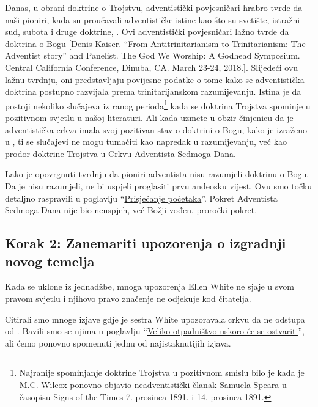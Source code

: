 Danas, u obrani doktrine o Trojstvu, adventistički povjesničari hrabro tvrde da naši pioniri, kada su proučavali adventističke istine kao što su svetište, istražni sud, subota i druge doktrine, . Ovi adventistički povjesničari lažno tvrde da doktrina o Bogu [Denis Kaiser. “From Antitrinitarianism to Trinitarianism: The Adventist story” and Panelist. The God We Worship: A Godhead Symposium. Central California Conference, Dinuba, CA. March 23-24, 2018.]. Slijedeći ovu lažnu tvrdnju, oni predstavljaju povijesne podatke o tome kako se adventistička doktrina postupno razvijala prema trinitarijanskom razumijevanju. Istina je da postoji nekoliko slučajeva iz ranog perioda\footnote{Najranije spominjanje doktrine Trojstva u pozitivnom smislu bilo je kada je M.C. Wilcox ponovno objavio neadventistički članak Samuela Speara u časopisu Signs of the Times 7. prosinca 1891. i 14. prosinca 1891.} kada se doktrina Trojstva spominje u pozitivnom svjetlu u našoj literaturi. Ali kada uzmete u obzir činjenicu da je adventistička crkva imala svoj pozitivan stav o doktrini o Bogu, kako je izraženo u , ti se slučajevi ne mogu tumačiti kao napredak u razumijevanju, već kao prodor doktrine Trojstva u Crkvu Adventista Sedmoga Dana.

Lako je opovrgnuti tvrdnju da pioniri adventista nisu razumjeli doktrinu o Bogu. Da je nisu razumjeli, ne bi uspjeli proglasiti prvu anđeosku vijest. Ovu smo točku detaljno raspravili u poglavlju “\hyperref[chap:remebering-the-beginning]{Prisjećanje početaka}”. Pokret Adventista Sedmoga Dana nije bio neuspjeh, već Božji vođen, proročki pokret.

\subsection*{Korak 2: Zanemariti upozorenja o izgradnji novog temelja}

Kada se  uklone iz jednadžbe, mnoga upozorenja Ellen White ne sjaje u svom pravom svjetlu i njihovo pravo značenje ne odjekuje kod čitatelja.

Citirali smo mnoge izjave gdje je sestra White upozoravala crkvu da ne odstupa od . Bavili smo se njima u poglavlju “\hyperref[chap:apostasy]{Veliko otpadništvo uskoro će se ostvariti}”, ali ćemo ponovno spomenuti jednu od najistaknutijih izjava.

